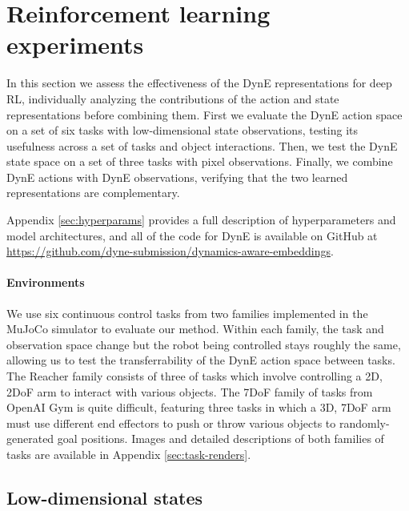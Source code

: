 \section{Reinforcement learning experiments}
In this section we assess the effectiveness of the DynE representations for deep RL, individually analyzing the contributions of the action and state representations before combining them.
First we evaluate the DynE action space on a set of six tasks with low-dimensional state observations, testing its usefulness across a set of tasks and object interactions.
Then, we test the DynE state space on a set of three tasks with pixel observations.
Finally, we combine DynE actions with DynE observations, verifying that the two learned representations are complementary.

Appendix \ref{sec:hyperparams} provides a full description of hyperparameters and model architectures, and all of the code for DynE is available on GitHub at \url{https://github.com/dyne-submission/dynamics-aware-embeddings}.

\paragraph{Environments}

We use six continuous control tasks from two families implemented in the MuJoCo simulator \citep{todorov2012mujoco} to evaluate our method.
Within each family, the task and observation space change but the robot being controlled stays roughly the same, allowing us to test the transferrability of the DynE action space between tasks.
The Reacher family consists of three of tasks which involve controlling a 2D, 2DoF arm to interact with various objects.
The 7DoF family of tasks from OpenAI Gym \citep{brockman2016openai} is quite difficult, featuring three tasks in which a 3D, 7DoF arm must use different end effectors to push or throw various objects to randomly-generated goal positions.
Images and detailed descriptions of both families of tasks are available in Appendix \ref{sec:task-renders}.


\subsection{Low-dimensional states}
\label{sec:action_experiments}


